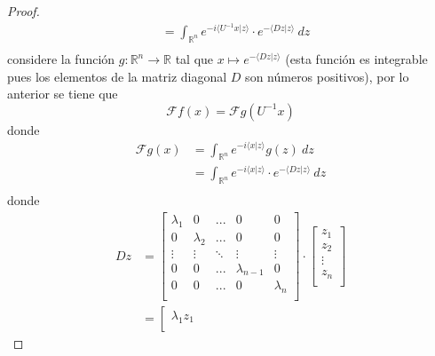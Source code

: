 \documentclass[12pt]{report}
\newcounter{it}
\theoremstyle{largebreak}
\newcommand\cf[3]{\ensuremath{#1:#2\rightarrow#3}}
\newcommand\pint[2]{\ensuremath{\langle#1| #2\rangle}}
\newcommand{\fou}[1]{\ensuremath{\mathcal{F}#1}}
\begin{document}
\begin{proof}
\begin{equation*}
\begin{split}
                &=\int_{\mathbb{R}^n}e^{ -i\pint{U^{-1}x}{z}}\cdot e^{-\pint{Dz}{z}}\:dz\\
            \end{split}
        \end{equation*}
        considere la función $\cf{g}{\mathbb{R}^n}{\mathbb{R}}$ tal que $x\mapsto e^{ -\pint{Dz}{z}}$ (esta función es integrable pues los elementos de la matriz diagonal $D$ son números positivos), por lo anterior se tiene que
        \begin{equation*}
            \fou{f}(x)=\fou{g}(U^{-1}x)
        \end{equation*}
        donde
        \begin{equation*}
            \begin{split}
                \fou{g}(x)&=\int_{\mathbb{R}^n}e^{ -i\pint{x}{z}}g(z)\:dz\\
                &=\int_{\mathbb{R}^n}e^{ -i\pint{x}{z}}\cdot e^{-\pint{Dz}{z}}\:dz\\
            \end{split}
        \end{equation*}
        donde
        \begin{equation*}
            \begin{split}
                Dz&=\left[
                    \begin{array}{ccccc}
                        \lambda_1 & 0 & ... & 0 & 0\\
                        0 & \lambda_2 & ... & 0 & 0\\
                        \vdots & \vdots & \ddots & \vdots & \vdots \\
                        0 & 0 & ... & \lambda_{ n-1} & 0\\
                        0 & 0 & ... & 0 & \lambda_n\\
                    \end{array}
                 \right]\cdot\left[\begin{array}{c}
                    z_1\\
                    z_2\\
                    \vdots\\
                    z_n\\
                \end{array}\right]\\
                &=\left[\begin{array}{c}
                    \lambda_1z_1\\

\end{array}
\end{split}
\end{equation*}
\end{proof}
\end{document}
